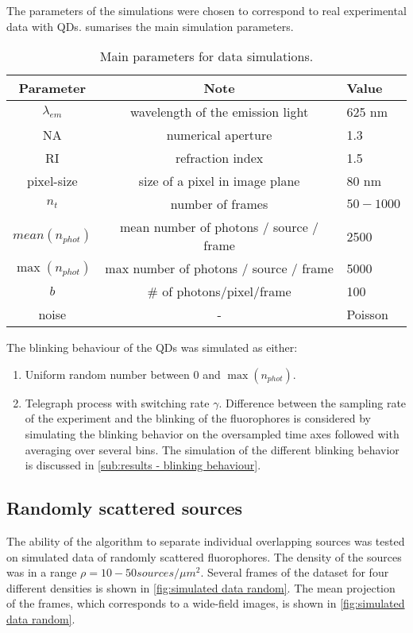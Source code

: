 The parameters of the simulations were chosen to correspond to real experimental data with QDs.   sumarises the main simulation parameters. 
%
\begin{table}[!h]
	\centering
	\begin{tabular}{|c|c|l|}
		\hline 
		Parameter 		& Note  							& Value\tabularnewline
		\hline \hline 
		$\lambda_{em}$ 	& wavelength of the emission light 	& 625 nm\tabularnewline
		\hline 
		NA 				& numerical aperture 				& 1.3\tabularnewline
		\hline 
		RI 				& refraction index 					& 1.5\tabularnewline
		\hline 
		pixel-size 		& size of a pixel in image plane	& 80 nm\tabularnewline
		\hline 
		$n_{t}$ 			& number of frames  					& $50-1000$\tabularnewline
		\hline 
		$\unit{mean}(n_{phot})$ & mean number of photons / source / frame 	& 2500\tabularnewline
		\hline 
		$\max(n_{phot})$ & max number of photons / source / frame 	& 5000\tabularnewline
		\hline 
		$b$ 				& \# of photons/pixel/frame 			& 100\tabularnewline
		\hline
		noise			& 		-						& Poisson\tabularnewline
		\hline
	\end{tabular}
	\caption{Main parameters for data simulations.}
	\label{tab:Simulations parameters}
\end{table}

The blinking behaviour of the QDs was simulated as either:
%
\begin{enumerate}
	\item
	Uniform random number between $0$ and $\max(n_{phot})$.
	\item
	Telegraph process with switching rate $\gamma$. Difference between the sampling rate of the experiment and the blinking of the fluorophores is considered by simulating the blinking behavior on the oversampled time axes followed with averaging over several bins. The simulation of the different blinking behavior is discussed in \autoref{sub:results - blinking behaviour}. 
\end{enumerate}
 
\clearpage
\subsection{Randomly scattered sources\label{sub:Simul random}}
The ability of the algorithm to separate individual overlapping sources was tested on simulated data of randomly scattered fluorophores.     The density of the sources was in a range $\rho=10-50 \unit{sources/\mu m^{2}}$. Several frames of the dataset for four different densities is shown in  \autoref{fig:simulated data random}. The mean projection of the frames, which corresponds to a wide-field images, is shown in \autoref{fig:simulated data random}.

